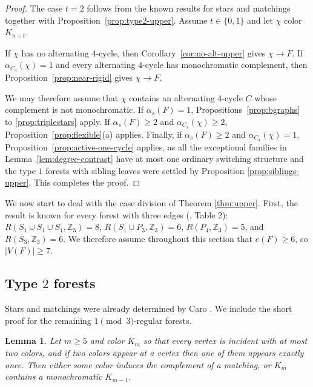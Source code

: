\documentclass[11pt]{article}
\newtheorem{lemma}[theorem]{Lemma}
\newcommand{\Z}{\mathbb Z}
\newcommand{\as}{\alpha_s}
\newcommand{\ac}{\alpha_{C_4}}
\begin{document}
\begin{proof}
The case $t=2$ follows from the known results for stars and matchings \cite{caro1996zero} together with Proposition~\ref{prop:type2-upper}.  Assume $t\in\{0,1\}$ and let $\chi$ color $K_{n+t}$.

If $\chi$ has no alternating $4$-cycle, then Corollary~\ref{cor:no-alt-upper} gives $\chi\to F$.  If $\ac(\chi)=1$ and every alternating $4$-cycle has monochromatic complement, then Proposition~\ref{prop:near-rigid} gives $\chi\to F$.

We may therefore assume that $\chi$ contains an alternating $4$-cycle $C$ whose complement is not monochromatic.  If $\as(F)=1$, Propositions~\ref{prop:bgraphs} to \ref{prop:triplestars} apply.  If $\as(F)\ge2$ and $\ac(\chi)\ge2$, Proposition~\ref{prop:flexible}(a) applies.  Finally, if $\as(F)\ge2$ and $\ac(\chi)=1$, Proposition~\ref{prop:active-one-cycle} applies, as all the exceptional families in Lemma~\ref{lem:degree-contrast}  have at most one ordinary switching structure and the type $1$ forests with sibling leaves were settled by Proposition \ref{prop:siblings-upper}. This completes the proof.
\end{proof}


We now start to deal with the case division of Theorem \ref{thm:upper}. First, the result is known for every forest with three edges (\cite{caro1996zero}, Table 2): $R(S_1\cup S_1\cup S_1,\Z_3)=8$, $R(S_1\cup P_3,\Z_3)=6$, $R(P_4,\Z_3)=5$, and $R(S_3,\Z_3)=6$.  We therefore assume throughout this section that $e(F)\ge6$, so $|V(F)|\ge7$.

\subsection{Type $2$ forests}

Stars and matchings were already determined by Caro \cite{caro1996zero}.  We include the short proof for the remaining $1\pmod3$-regular forests.

\begin{lemma}\label{lem:dominant}
Let $m\ge5$ and color $K_m$ so that every vertex is incident with at most two colors, and if two colors appear at a vertex then one of them appears exactly once.  Then either some color induces the complement of a matching, or $K_m$ contains a monochromatic $K_{m-1}$.
\end{lemma}
\end{document}
